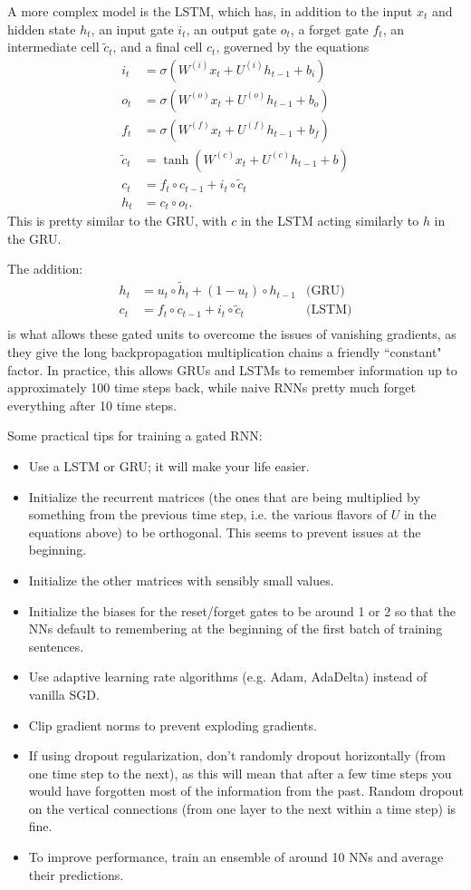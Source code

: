 A more complex model is the LSTM, which has, in addition to the input $x_t$ and hidden state $h_t$, an input gate $i_t$, an output gate $o_t$, a forget gate $f_t$, an intermediate cell $\tilde{c}_t$, and a final cell $c_t$, governed by the equations
\begin{align*}
i_t &= \sigma\left(W^{(i)}x_t + U^{(i)}h_{t-1} + b_i\right) \\
o_t &= \sigma\left(W^{(o)}x_t + U^{(o)}h_{t-1} + b_o\right) \\
f_t &= \sigma\left(W^{(f)}x_t + U^{(f)}h_{t-1} + b_f\right) \\
\tilde{c}_t &= \tanh\left(W^{(c)} x_t + U^{(c)} h_{t-1} + b\right) \\
c_t &= f_t \circ c_{t-1} + i_t \circ \tilde{c}_t \\
h_t &= c_t \circ o_t.
\end{align*}
This is pretty similar to the GRU, with $c$ in the LSTM acting similarly to $h$ in the GRU.

The addition:
\begin{align*}
h_t &= u_t \circ \tilde{h}_t + (1 - u_t) \circ h_{t-1} &\text{(GRU)}\\
c_t &= f_t \circ c_{t-1} + i_t \circ \tilde{c}_t &\text{(LSTM)}\\
\end{align*}
is what allows these gated units to overcome the issues of vanishing gradients, as they give the long backpropagation multiplication chains a friendly ``constant" factor. In practice, this allows GRUs and LSTMs to remember information up to approximately 100 time steps back, while naive RNNs pretty much forget everything after 10 time steps.

Some practical tips for training a gated RNN:
\begin{itemize}
\item Use a LSTM or GRU; it will make your life easier.
\item Initialize the recurrent matrices (the ones that are being multiplied by something from the previous time step, i.e. the various flavors of $U$ in the equations above) to be orthogonal. This seems to prevent issues at the beginning.
\item Initialize the other matrices with sensibly small values.
\item Initialize the biases for the reset/forget gates to be around 1 or 2 so that the NNs default to remembering at the beginning of the first batch of training sentences.
\item Use adaptive learning rate algorithms (e.g. Adam, AdaDelta) instead of vanilla SGD.
\item Clip gradient norms to prevent exploding gradients.
\item If using dropout regularization, don't randomly dropout horizontally (from one time step to the next), as this will mean that after a few time steps you would have forgotten most of the information from the past. Random dropout on the vertical connections (from one layer to the next within a time step) is fine.
\item To improve performance, train an ensemble of around 10 NNs and average their predictions.
\end{itemize}

